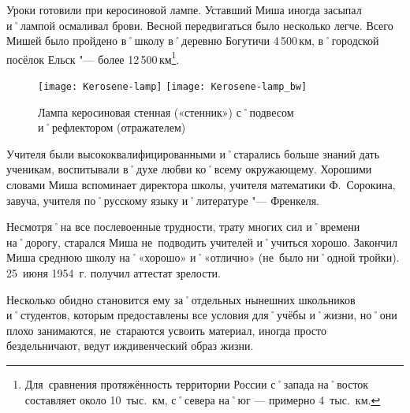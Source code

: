 Уроки готовили при керосиновой лампе. Уставший Миша иногда засыпал и˚лампой осмаливал брови. Весной передвигаться было несколько легче. Всего Мишей было пройдено в˚школу в˚деревню Богутичи 4\,500\,км, в˚городской посёлок Ельск "--- более 12\,500\,км\footnote{Для~сравнения протяжённость территории России с˚запада на˚восток составляет около 10~тыс.~км, с˚севера на˚юг — примерно 4~тыс.~км.}. 

\begin{wrapfigure}{O}{.25\textwidth}
\centering
\ifPubTypeEBook
	\texttt{[image: Kerosene-lamp]}
\else
	\texttt{[image: Kerosene-lamp\_bw]}
\fi
\caption[Лампа керосиновая стенная («стенник») с˚подвесом и˚рефлектором (отражателем)]{Лампа керосиновая стенная («стенник») с˚подвесом и˚рефлектором (отражателем)\footnotemark}
\label{fig:Kerosene-lamp}
\end{wrapfigure}

Учителя были высококвалифицированными и˚старались больше знаний дать ученикам, воспитывали в˚духе любви ко˚всему окружающему. Хорошими словами Миша вспоминает директора школы, учителя математики Ф.~Сорокина, завуча, учителя по˚русскому языку и˚литературе "--- Френкеля. 

Несмотря˚на все послевоенные трудности, трату многих сил и˚времени на˚дорогу, старался Миша не~подводить учителей и˚учиться хорошо. Закончил Миша среднюю школу на˚«хорошо» и˚«отлично» (не~было ни˚одной тройки). 25~июня 1954~г. получил аттестат зрелости.

Несколько обидно становится ему за˚отдельных нынешних школьников и˚студентов, которым предоставлены все условия для˚учёбы и˚жизни, но˚они плохо занимаются, не~стараются усвоить материал, иногда просто бездельничают, ведут иждивенческий образ жизни.

